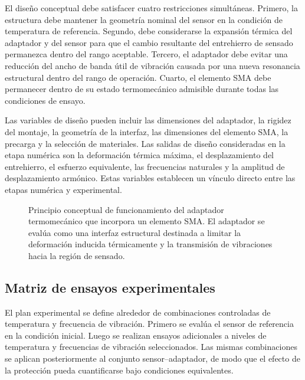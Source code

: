 \documentclass[conference]{IEEEtran}
\begin{document}
El diseño conceptual debe satisfacer cuatro restricciones simultáneas. Primero, la estructura debe mantener la geometría nominal del sensor en la condición de temperatura de referencia. Segundo, debe considerarse la expansión térmica del adaptador y del sensor para que el cambio resultante del entrehierro de sensado permanezca dentro del rango aceptable. Tercero, el adaptador debe evitar una reducción del ancho de banda útil de vibración causada por una nueva resonancia estructural dentro del rango de operación. Cuarto, el elemento SMA debe permanecer dentro de su estado termomecánico admisible durante todas las condiciones de ensayo.

Las variables de diseño pueden incluir las dimensiones del adaptador, la rigidez del montaje, la geometría de la interfaz, las dimensiones del elemento SMA, la precarga y la selección de materiales. Las salidas de diseño consideradas en la etapa numérica son la deformación térmica máxima, el desplazamiento del entrehierro, el esfuerzo equivalente, las frecuencias naturales y la amplitud de desplazamiento armónico. Estas variables establecen un vínculo directo entre las etapas numérica y experimental.


\begin{figure}[t]
\centering
{}
\caption{Principio conceptual de funcionamiento del adaptador termomecánico que incorpora un elemento SMA. El adaptador se evalúa como una interfaz estructural destinada a limitar la deformación inducida térmicamente y la transmisión de vibraciones hacia la región de sensado.}
\label{fig:adapter_concept}
\end{figure}

\subsection{Matriz de ensayos experimentales}

El plan experimental se define alrededor de combinaciones controladas de temperatura y frecuencia de vibración. Primero se evalúa el sensor de referencia en la condición inicial. Luego se realizan ensayos adicionales a niveles de temperatura y frecuencias de vibración seleccionados. Las mismas combinaciones se aplican posteriormente al conjunto sensor--adaptador, de modo que el efecto de la protección pueda cuantificarse bajo condiciones equivalentes.
\end{document}
